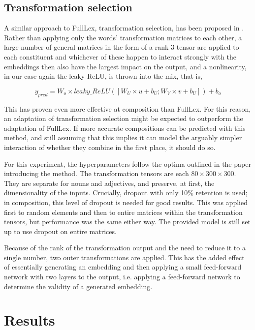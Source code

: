 \documentclass[a4paper, 12pt]{article}
\begin{document}
\subsection{Transformation selection}
A similar approach to FullLex, transformation selection, has been proposed in \cite{TSelect}. Rather than applying only the words' transformation matrices to each other, a large number of general matrices in the form of a rank 3 tensor are applied to each constituent and whichever of these happen to interact strongly with the embeddings then also have the largest impact on the output, and a nonlinearity, in our case again the leaky ReLU, is thrown into the mix, that is,

\begin{equation} \label{eq:6}
	y_{pred} = W_o \times leaky\_ReLU([W_U \times u + b_U; W_V \times v + b_U]) + b_o
\end{equation}

This has proven even more effective at composition than FullLex. For this reason, an adaptation of transformation selection might be expected to outperform the adaptation of FullLex. If more accurate compositions can be predicted with this method, and still assuming that this implies it can model the arguably simpler interaction of whether they combine in the first place, it should do so.

For this experiment, the hyperparameters follow the optima outlined in the paper introducing the method. The transformation tensors are each $ 80 \times 300 \times 300 $. They are separate for nouns and adjectives, and preserve, at first, the dimensionality of the inputs. Crucially, dropout with only 10\% retention is used; in composition, this level of dropout is needed for good results. This was applied first to random elements and then to entire matrices within the transformation tensors, but performance was the same either way. The provided model is still set up to use dropout on entire matrices.

Because of the rank of the transformation output and the need to reduce it to a single number, two outer transformations are applied. This has the added effect of essentially generating an embedding and then applying a small feed-forward network with two layers to the output, i.e. applying a feed-forward network to determine the validity of a generated embedding.


\section{Results}
\end{document}
